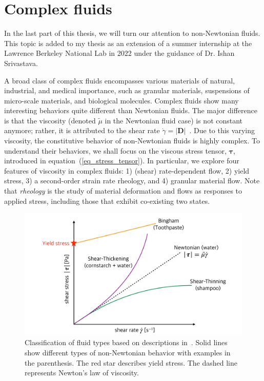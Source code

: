 \section{Complex fluids}
\label{sec:intro_complex_fluid}
In the last part of this thesis, we will turn our attention to non-Newtonian fluids. This topic is added to my thesis as an extension of a summer internship at the Lawrence Berkeley National Lab in 2022 under the guidance of Dr. Ishan Srivastava. 
\par
\vphantom{text}
\par
A broad class of complex fluids encompasses various materials of natural, industrial, and medical importance, such as granular materials, suspensions of micro-scale materials, and biological molecules.
Complex fluids show many interesting behaviors quite different than Newtonian fluids. 
The major difference is that the viscosity (denoted $\tilde{\mu}$ in the Newtonian fluid case) is not constant anymore; rather, it is attributed to the shear rate $\dot{\gamma} = \left| {\boldsymbol{D}} \right|$~\cite{kundu_chapter_2016}.
Due to this varying viscosity, the constitutive behavior of non-Newtonian fluids is highly complex. 
To understand their behaviors, we shall focus on the viscous stress tensor, $\bm \tau$, introduced in equation~(\ref{eq_stress_tensor}). 
In particular, we explore four features of viscosity in complex fluids: 1) (shear) rate-dependent flow, 2) yield stress, 3) a second-order strain rate rheology, and 4) granular material flow.
Note that {\textit{rheology}} is the study of material deformation and flows as responses to applied stress, including those that exhibit co-existing two states.
\begin{figure}[h]
	\begin{center}
		\includegraphics[scale=0.2]{figures/fig_yield_stress_graph.pdf}
	\end{center}
   \caption{Classification of fluid types based on descriptions in~\cite{irgens_rheology_2014}. Solid lines show different types of non-Newtonian behavior with examples in the parenthesis. The red star describes yield stress. The dashed line represents Newton's law of viscosity.}
\label{fig_rheology}
\end{figure}
